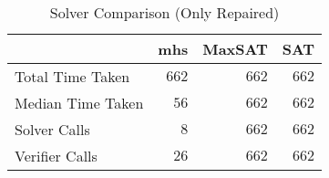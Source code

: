 \begin{table}[htp]
\caption{Solver Comparison (Only Repaired)}
\label{Ta:solver_comparison_repaired}
\begin{center}

\def\arraystretch{1.1}
\setlength\tabcolsep{7pt}

\begin{tabular}{|l|r|r|r|}
\hline

\multicolumn{1}{|c|}{} & \multicolumn{1}{|c|}{\textbf{mhs}} & \multicolumn{1}{|c|}{\textbf{MaxSAT}} & \multicolumn{1}{|c|}{\textbf{SAT}} \\ \hline \hline
Total Time Taken & $662$ & $662$ & $662$\\ \hline
Median Time Taken & $56$ & $662$ & $662$\\ \hline
Solver Calls & $8$ & $662$ & $662$\\ \hline
Verifier Calls & $26$ & $662$ & $662$\\ \hline

\end{tabular}

\end{center}
\end{table}
